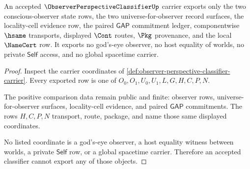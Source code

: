 \begin{theorem}
\label{thm:observer-perspective-classifier-nonescape}
An accepted $\ObserverPerspectiveClassifierUp$ carrier exports only the two conscious-observer state rows, the two universe-for-observer record surfaces, the locality-cell evidence row, the paired $\mathsf{GAP}$ commitment ledger, componentwise $\hsame$ transports, displayed $\Cont$ routes, $\Pkg$ provenance, and the local $\NameCert$ row. It exports no god's-eye observer, no host equality of worlds, no private $\mathsf{Self}$ access, and no global spacetime carrier.
\end{theorem}
\begin{proof}
Inspect the carrier coordinates of \autoref{def:observer-perspective-classifier-carrier}. Every exported row is one of $O_0,O_1,U_0,U_1,L,G,H,C,P,N$.

The positive comparison data remain public and finite: observer rows, universe-for-observer surfaces, locality-cell evidence, and paired $\mathsf{GAP}$ commitments. The rows $H,C,P,N$ transport, route, package, and name those same displayed coordinates.

No listed coordinate is a god's-eye observer, a host equality witness between worlds, a private $\mathsf{Self}$ row, or a global spacetime carrier. Therefore an accepted classifier cannot export any of those objects.
\end{proof}

